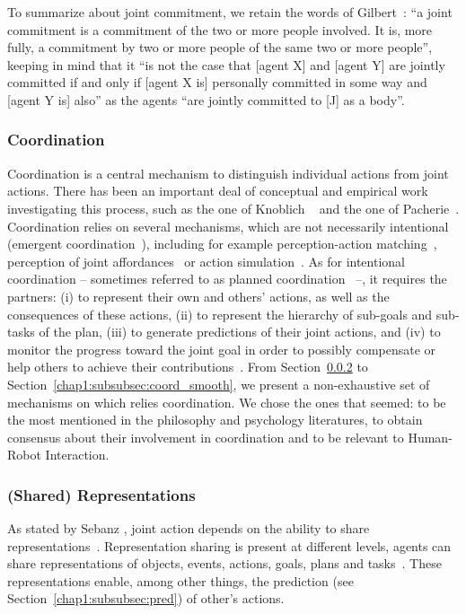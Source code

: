 \documentclass[a4paper,11pt,twoside]{StyleThese}
\begin{document}
To summarize about joint commitment, we retain the words of Gilbert~\cite[p.~7]{gilbert_2013_joint}: ``a joint commitment is a commitment of the two or more people involved. It is, more fully, a commitment by two or more people of the same two or more people'', keeping in mind that it ``is not the case that [agent X] and [agent Y] are jointly committed if and only if [agent X is] personally committed in some way and [agent Y is] also'' as the agents ``are jointly committed to [J] as a body''.

\subsubsection{Coordination}
Coordination is a central mechanism to distinguish individual actions from joint actions. There has been an important deal of conceptual and empirical work investigating this process, such as the one of Knoblich \etal~\cite{knoblich_2011_joint} and the one of Pacherie~\cite{pacherie_2012_agency}. Coordination relies on several mechanisms, which are not necessarily intentional (emergent coordination~\cite{knoblich_2011_joint}), including for example perception-action matching~\cite{brass_2001_movement}, perception of joint affordances~\cite{ramenzoni_2008_short} or action simulation~\cite{sebanz_2009_prediction}. As for intentional coordination – sometimes referred to as planned coordination~\cite{knoblich_2011_joint} –, it requires the partners: (i) to represent their own and others' actions, as well as the consequences of these actions, (ii) to represent the hierarchy of sub-goals and sub-tasks of the plan, (iii) to generate predictions of their joint actions, and (iv) to monitor the progress toward the joint goal in order to possibly compensate or help others to achieve their contributions~\cite{pacherie_2012_agency}. From Section~\ref{chap1:subsubsec:shared_rep} to Section~\ref{chap1:subsubsec:coord_smooth}, we present a non-exhaustive set of mechanisms on which relies coordination. We chose the ones that seemed: to be the most mentioned in the philosophy and psychology literatures, to obtain consensus about their involvement in coordination and to be relevant to Human-Robot Interaction. 

\subsubsection{(Shared) Representations}\label{chap1:subsubsec:shared_rep}
As stated by Sebanz \etal, joint action depends on the ability to share representations~\cite{sebanz_2006_joint}. Representation sharing is present at different levels, \ie agents can share representations of objects, events, actions, goals, plans and tasks~\cite{pacherie_2012_agency,vesper_2017_joint}. These representations enable, among other things, the prediction (see Section~\ref{chap1:subsubsec:pred}) of other's actions. 
\end{document}
